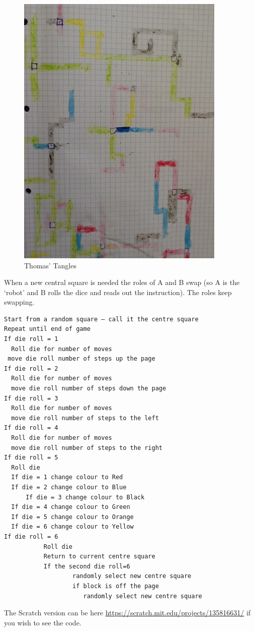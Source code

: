 \begin{figure}
    \centering
    \includegraphics[width=10cm]{chapters/chapterCT1/figures/tt1.JPG}
    \caption{Thomas' Tangles}
    \label{fig:ThomasTangles1}
\end{figure}

When a new central square is needed the roles of A and B swap (so A is the ‘robot’ and B rolls the dice and reads out the instruction). The roles keep swapping.

\begin{lstlisting}
Start from a random square – call it the centre square
Repeat until end of game
If die roll = 1
  Roll die for number of moves
 move die roll number of steps up the page
If die roll = 2
  Roll die for number of moves
  move die roll number of steps down the page
If die roll = 3
  Roll die for number of moves
  move die roll number of steps to the left 
If die roll = 4
  Roll die for number of moves
  move die roll number of steps to the right
If die roll = 5
  Roll die
  If die = 1 change colour to Red
  If die = 2 change colour to Blue
      If die = 3 change colour to Black
  If die = 4 change colour to Green
  If die = 5 change colour to Orange
  If die = 6 change colour to Yellow
If die roll = 6
           Roll die
           Return to current centre square
           If the second die roll=6
                   randomly select new centre square
                   if block is off the page
                      randomly select new centre square
\end{lstlisting}

The Scratch version can be here \url{https://scratch.mit.edu/projects/135816631/} if you wish to see the code.

